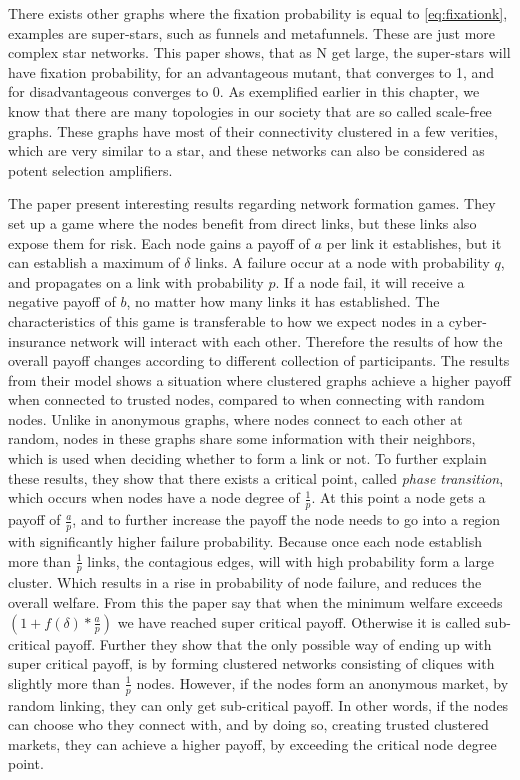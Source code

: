 There exists other graphs where the fixation probability is equal to \ref{eq:fixationk}, examples are super-stars, such as funnels and
metafunnels. These are just more complex star networks. This paper shows, that as N get large, the super-stars will have fixation probability, for an advantageous mutant, that converges to 1, and for disadvantageous converges to 0. 
As exemplified earlier in this chapter, we know that there are many
topologies in our society that are so called scale-free graphs. These graphs have most of their connectivity clustered in a few verities, which are very similar to a star, and these networks can also be considered as potent selection amplifiers. 


The paper \cite{contagion} present interesting results regarding network formation games. 
They set up a game where the nodes benefit from direct links, but these links also expose them for risk. 
Each node gains a payoff of $a$ per link it establishes, but it can establish a maximum of $\delta$ links.
A failure occur at a node with probability $q$, and propagates on a link with probability $p$. If a node fail, it will receive a negative payoff of $b$, no matter how many links it has established. The characteristics of this game is transferable to how we expect nodes in a cyber-insurance network will interact with each other. Therefore the results of how the overall payoff changes according to different collection of participants. 
The results from their model shows a situation where clustered graphs achieve a higher payoff when connected to trusted nodes, compared to when connecting with random nodes. Unlike in anonymous graphs, where nodes connect to each other at random, nodes in these graphs share some information with their neighbors, which is used when deciding whether to form a link or not. 
To further explain these results, they show that there exists a critical point, called \textit{phase transition}, which occurs when nodes have a node degree of $\frac{1}{p}$. 
At this point a node gets a payoff of $\frac{a}{p}$, and to further increase the payoff the node needs to go into a region with significantly higher failure probability. 
Because once each node establish more than $\frac{1}{p}$ links, the contagious edges, will with high probability form a large cluster. Which results in a rise in probability of node failure, and reduces the overall welfare.
From this the paper say that when the minimum welfare exceeds 
$(1+f(\delta)*\frac{a}{p})$
we have reached super critical payoff. Otherwise it is called sub-critical payoff. 
Further they show that the only possible way of ending up with super critical payoff, is by forming clustered networks consisting of cliques with slightly more than $\frac{1}{p}$ nodes. 
However, if the nodes form an anonymous market, by random linking, they can only get sub-critical payoff. 
In other words, if the nodes can choose who they connect with, and by doing so, creating trusted clustered markets, they can achieve a higher payoff, by exceeding the critical node degree point. 


